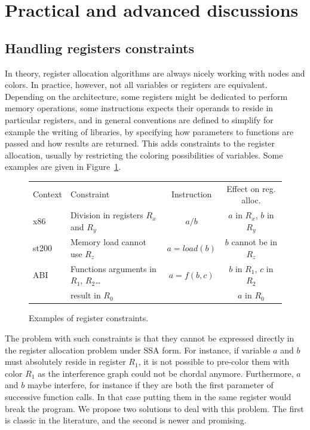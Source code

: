 {\section{Practical and advanced discussions}
\label{sec:practical-regalloc}


\subsection{Handling registers constraints}

In theory, register allocation algorithms are always nicely working with nodes 
and colors. In practice, however, not all variables or registers are 
equivalent. Depending on the architecture, some registers might be dedicated 
to perform memory operations, some instructions expects their operands to 
reside in particular registers, and in general conventions are defined to 
simplify for example the writing of libraries, by specifying how parameters to 
functions are passed and how results are returned. This adds constraints to the 
register allocation, usually by restricting the coloring possibilities of 
variables. Some examples are given in Figure~\ref{fig:reg-constraints}.

\begin{figure}
  \begin{center}
    \begin{tabular}{llcc}
    Context & Constraint  & Instruction & Effect on reg. alloc. \\
    x86 & Division in registers $R_x$ and $R_y$ & $a / b$ & $a$ in $R_x$, $b$ in $R_y$\\
    st200 & Memory load cannot use $R_z$ & $a = load(b)$ & $b$ cannot be in $R_z$\\
    ABI & Functions arguments in $R_1$, $R_2$\ldots & $a = f(b,c)$ & $b$ in $R_1$, $c$ in $R_2$ \\
     & result in $R_0$ & & $a$ in $R_0$\\
  \end{tabular}
  \end{center}
  \caption{Examples of register constraints.}
  \label{fig:reg-constraints}
\end{figure}


The problem with such constraints is that they cannot be expressed directly in 
the register allocation problem under SSA form. For instance, if variable $a$ and $b$ must 
absolutely reside in register $R_1$, it is not possible to pre-color them with 
color $R_1$ as the interference graph could not be chordal anymore.  
Furthermore, $a$ and $b$ maybe interfere, for instance if they are both the 
first parameter of successive function calls. In that case putting them in the 
same register would break the program. We propose two solutions 
to deal with this problem. The first is classic in the literature, and the 
second is newer and promising.


}
